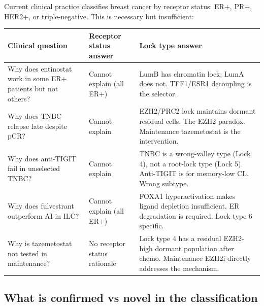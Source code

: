 \documentclass[12pt, a4paper]{article}
\begin{document}
Current clinical practice classifies breast cancer
by receptor status: ER$+$, PR$+$, HER2$+$, or
triple-negative. This is necessary but insufficient:

\begin{center}
\begin{tabular}{p{4cm}p{4.5cm}p{4.5cm}}
\toprule
\textbf{Clinical question}
& \textbf{Receptor status answer}
& \textbf{Lock type answer} \\
\midrule
Why does entinostat work in some ER$+$ patients
but not others?
& Cannot explain (all ER$+$)
& LumB has chromatin lock; LumA does not.
  TFF1/ESR1 decoupling is the selector. \\[0.3em]
Why does TNBC relapse late despite pCR?
& Cannot explain
& EZH2/PRC2 lock maintains dormant residual cells.
  The EZH2 paradox. Maintenance tazemetostat
  is the intervention. \\[0.3em]
Why does anti-TIGIT fail in unselected TNBC?
& Cannot explain
& TNBC is a wrong-valley type (Lock 4), not a
  root-lock type (Lock 5). Anti-TIGIT is for
  memory-low CL. Wrong subtype. \\[0.3em]
Why does fulvestrant outperform AI in ILC?
& Cannot explain (all ER$+$)
& FOXA1 hyperactivation makes ligand depletion
  insufficient. ER degradation is required.
  Lock type 6 specific. \\[0.3em]
Why is tazemetostat not tested in maintenance?
& No receptor status rationale
& Lock type 4 has a residual EZH2-high dormant
  population after chemo. Maintenance EZH2i
  directly addresses the mechanism. \\
\bottomrule
\end{tabular}
\end{center}

\subsection{What is confirmed vs novel in the classification}
\end{document}
